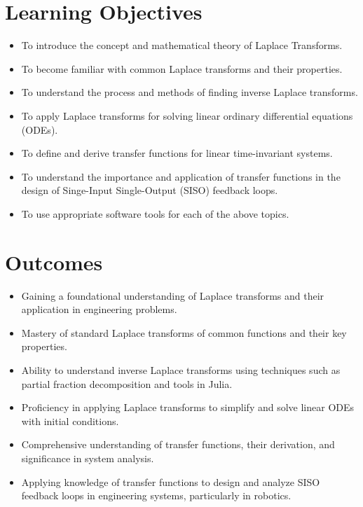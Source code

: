 \section*{Learning Objectives}

\begin{itemize}
    \item To introduce the concept and mathematical theory of Laplace Transforms.
    \item To become familiar with common Laplace transforms and their properties.
    \item To understand the process and methods of finding inverse Laplace transforms.
    \item To apply Laplace transforms for solving linear ordinary differential equations (ODEs).
    \item To define and derive transfer functions for linear time-invariant systems.
    \item To understand the importance and application of transfer functions in the design of Singe-Input Single-Output (SISO) feedback loops.
    \item To use appropriate software tools for each of the above topics.
\end{itemize}

\section*{Outcomes}

\begin{itemize}
    \item Gaining a foundational understanding of Laplace transforms and their application in engineering problems.
    \item Mastery of standard Laplace transforms of common functions and their key properties.
    \item Ability to understand inverse Laplace transforms using techniques such as partial fraction decomposition and tools in Julia.
    \item Proficiency in applying Laplace transforms to simplify and solve linear ODEs with initial conditions.
    \item Comprehensive understanding of transfer functions, their derivation, and significance in system analysis.
    \item Applying knowledge of transfer functions to design and analyze SISO feedback loops in engineering systems, particularly in robotics.
\end{itemize}



